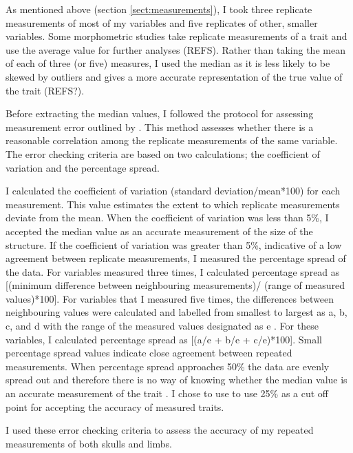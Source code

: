 	As mentioned above (section \ref{sect:measurements}), I took three replicate measurements of most of my variables and five replicates of other, smaller variables. 
	Some morphometric studies take replicate measurements of a trait and use the average value for further analyses (REFS). Rather than taking the mean of each of three (or five) measures, I used the median as it is less likely to be skewed by outliers and gives a more accurate representation of the true value of the trait (REFS?).
	
	
	Before extracting the median values, I followed the protocol for assessing measurement error outlined by \citep{Cooper2009}. This method assesses whether there is a reasonable correlation among the replicate measurements of the same variable. The error checking criteria are based on two calculations; the coefficient of variation and the percentage spread.
	
	I calculated the coefficient of variation (standard deviation/mean*100) for each measurement. This value estimates the extent to which replicate measurements deviate from the mean. When the coefficient of variation was less than 5\%, I accepted the median value as an accurate measurement of the size of the structure. 
	If the coefficient of variation was greater than 5\%, indicative of a low agreement between replicate measurements, I measured the percentage spread of the data. For variables measured three times, I calculated percentage spread as [(minimum difference between neighbouring measurements)/ (range of measured values)*100].
	For variables that I measured five times, the differences between neighbouring values were calculated and labelled from smallest to largest as a, b, c, and d with the range of the measured values designated as e \citep{Cooper2009}. For these variables, I calculated percentage spread as [(a/e + b/e + c/e)*100]. 
	Small percentage spread values indicate close agreement between repeated measurements. When percentage spread approaches 50\% the data are evenly spread out and therefore there is no way of knowing whether the median value is an accurate measurement of the trait \citep{Cooper2009}. I chose to use to use 25\% as a cut off point for accepting the accuracy of measured traits.

	I used these error checking criteria to assess the accuracy of my repeated measurements of both skulls and limbs. 


